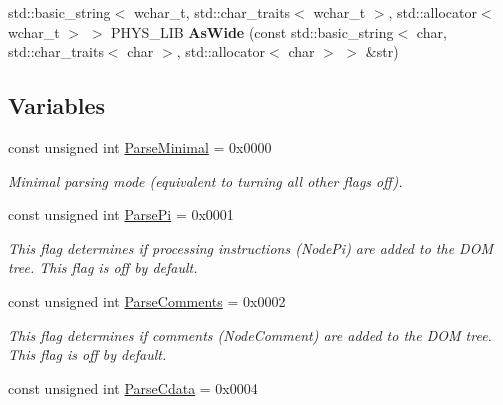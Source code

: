 \begin{DoxyCompactItemize}
\item 
\hypertarget{namespacephys_1_1xml_ad365a4575e9bdc674e7512a573f05c08}{
std::basic\_\-string$<$ wchar\_\-t, std::char\_\-traits$<$ wchar\_\-t $>$, std::allocator$<$ wchar\_\-t $>$ $>$ PHYS\_\-LIB {\bfseries AsWide} (const std::basic\_\-string$<$ char, std::char\_\-traits$<$ char $>$, std::allocator$<$ char $>$ $>$ \&str)}
\label{d9/d27/namespacephys_1_1xml_ad365a4575e9bdc674e7512a573f05c08}

\end{DoxyCompactItemize}
\subsection*{Variables}
\begin{DoxyCompactItemize}
\item 
const unsigned int \hyperlink{namespacephys_1_1xml_ab660837afbc6aaab22425d8d23e8f2e4}{ParseMinimal} = 0x0000
\begin{DoxyCompactList}\small\item\em Minimal parsing mode (equivalent to turning all other flags off). \item\end{DoxyCompactList}\item 
\hypertarget{namespacephys_1_1xml_a4d324954fc33d50155bae04587da13e2}{
const unsigned int \hyperlink{namespacephys_1_1xml_a4d324954fc33d50155bae04587da13e2}{ParsePi} = 0x0001}
\label{d9/d27/namespacephys_1_1xml_a4d324954fc33d50155bae04587da13e2}

\begin{DoxyCompactList}\small\item\em This flag determines if processing instructions (NodePi) are added to the DOM tree. This flag is off by default. \item\end{DoxyCompactList}\item 
\hypertarget{namespacephys_1_1xml_a83ba30a7bee5a0fd4aa2f6136c8793fc}{
const unsigned int \hyperlink{namespacephys_1_1xml_a83ba30a7bee5a0fd4aa2f6136c8793fc}{ParseComments} = 0x0002}
\label{d9/d27/namespacephys_1_1xml_a83ba30a7bee5a0fd4aa2f6136c8793fc}

\begin{DoxyCompactList}\small\item\em This flag determines if comments (NodeComment) are added to the DOM tree. This flag is off by default. \item\end{DoxyCompactList}\item 
\hypertarget{namespacephys_1_1xml_aec00a2a16700dfd76f8f3c776bd000ac}{
const unsigned int \hyperlink{namespacephys_1_1xml_aec00a2a16700dfd76f8f3c776bd000ac}{ParseCdata} = 0x0004}
\label{d9/d27/namespacephys_1_1xml_aec00a2a16700dfd76f8f3c776bd000ac}


\end{DoxyCompactItemize}
